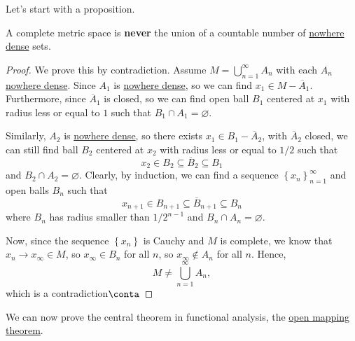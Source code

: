 Let's start with a proposition.

\begin{proposition}\label{prop:Baire-category}
	A complete metric space is \textbf{never} the union of a countable number of \hyperref[def:nowhere-dense]{nowhere dense} sets.
\end{proposition}
\begin{proof}
	We prove this by contradiction. Assume \(M = \bigcup_{n=1}^{\infty} A_n\) with each \(A_n\) \hyperref[def:nowhere-dense]{nowhere dense}. Since \(A_1\) is \hyperref[def:nowhere-dense]{nowhere dense}, so we can find \(x_1\in M- \overline{A} _1\). Furthermore, since \(\overline{A} _1\) is closed, so we can find open ball \(B_1\) centered at \(x_1\) with radius less or equal to \(1\) such that \(B_1 \cap A_1= \varnothing \).

	Similarly, \(A_2\) is \hyperref[def:nowhere-dense]{nowhere dense}, so there exists \(x_1\in B_1 - \overline{A} _2\), with \(\overline{A} _2\) closed, we can still find ball \(B_2\) centered at \(x_2\) with radius less or equal to \(1 / 2\) such that
	\[
		x_2 \in B_2 \subseteq \overline{B} _2 \subseteq B_1
	\]
	and \(B_2 \cap A_2 = \varnothing \). Clearly, by induction, we can find a sequence \(\left\{ x_n \right\} _{n=1}^{\infty} \) and open balls \(B_n\) such that
	\[
		x_{n+1} \in B_{n+1} \subseteq \overline{B} _{n+1} \subseteq B_n
	\]
	where \(B_n\) has radius smaller than \(1 / 2^{n-1}\) and \(B_n \cap A_n = \varnothing \).

	Now, since the sequence \(\left\{ x_ n \right\} \) is Cauchy and \(M\) is complete, we know that \(x_n \to x_{\infty }\in M\), so \(x_{\infty }\in B_n\) for all \(n\), so \(x_\infty \notin A_n\) for all \(n\). Hence,
	\[
		M \neq \bigcup\limits_{n=1}^{\infty} A_n,
	\]
	which is a contradiction\(\conta\)
\end{proof}

We can now prove the central theorem in functional analysis, the \hyperref[thm:open-mapping]{open mapping theorem}.

